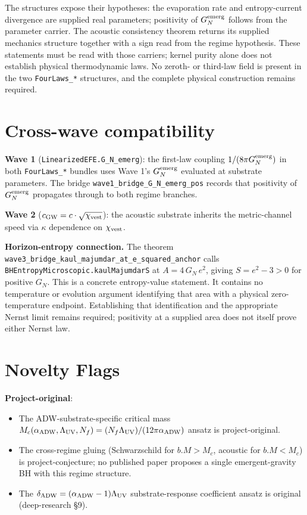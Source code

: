 \documentclass[prd,aps,twocolumn,floatfix,nofootinbib,superscriptaddress]{revtex4-2}
\newcommand{\Mc}{M_{c}}
\newcommand{\GN}{G_{N}^{\rm emerg}}
\newcommand{\aADW}{\alpha_{\rm ADW}}
\newcommand{\Ladw}{\Lambda_{\rm UV}}
\newcommand{\Nf}{N_{f}}
\newcommand{\xivest}{\chi_{\rm vest}}
\newcommand{\dADW}{\delta_{\rm ADW}}
\begin{document}
The structures expose their hypotheses: the evaporation rate and
entropy-current divergence are supplied real parameters; positivity
of $\GN$ follows from the parameter carrier. The acoustic consistency
theorem returns its supplied mechanics structure together with a sign
read from the regime hypothesis. These statements must be read
with those carriers; kernel purity alone does not establish physical
thermodynamic laws. No zeroth- or third-law field is present in the two
\texttt{FourLaws\_*} structures, and the complete physical construction
remains required.

\section{Cross-wave compatibility}
\label{sec:cross}

\textbf{Wave 1} (\texttt{LinearizedEFE.G\_N\_emerg}): the first-law
coupling $1/(8\pi \GN)$ in both \texttt{FourLaws\_*} bundles uses
Wave 1's $\GN$ evaluated at substrate parameters. The bridge
\texttt{wave1\_bridge\_G\_N\_emerg\_pos} records that positivity of
$\GN$ propagates through to both regime branches.

\textbf{Wave 2} ($c_{\rm GW} = c \cdot \sqrt{\xivest}$): the
acoustic substrate inherits the metric-channel speed via
$\kappa$ dependence on $\xivest$.

\textbf{Horizon-entropy connection.} The theorem
\texttt{wave3\_bridge\_\allowbreak kaul\_majumdar\_\allowbreak at\_e\_squared\_anchor}
calls \texttt{BHEntropyMicroscopic.kaulMajumdarS} at
$A = 4\,G_N\,e^2$, giving $S = e^2 - 3 > 0$ for positive $G_N$.
This is a concrete entropy-value statement. It contains no temperature
or evolution argument identifying that area with a physical
zero-temperature endpoint. Establishing that identification and the
appropriate Nernst limit remains required; positivity at a supplied
area does not itself prove either Nernst law.

\section{Novelty Flags}
\label{sec:novelty}

\textbf{Project-original}:
\begin{itemize}
\item The ADW-substrate-specific critical mass
  $\Mc(\aADW, \Ladw, \Nf) = (\Nf \Ladw) / (12\pi \aADW)$
  ansatz is project-original.
\item The cross-regime gluing (Schwarzschild for $b.M > \Mc$,
  acoustic for $b.M < \Mc$) is project-conjecture; no published
  paper proposes a single emergent-gravity BH with this regime
  structure.
\item The $\dADW = (\aADW - 1)\Ladw$ substrate-response coefficient
  ansatz is original (deep-research \S9).
\end{itemize}
\end{document}
